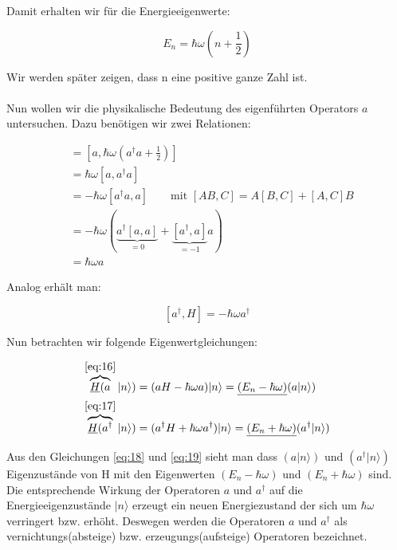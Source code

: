 Damit erhalten wir für die Energieeigenwerte:

\begin{equation}
  \label{eq:15}
  \boxed{E_n = \hbar\omega\left(n + \frac{1}{2}\right) }
\end{equation}

Wir werden später zeigen, dass n eine positive ganze Zahl ist.\\
\\
Nun wollen wir die physikalische Bedeutung des eigenführten Operators \(a\) untersuchen. Dazu benötigen wir zwei Relationen:

\begin{align}
  [a,H] &= [a,\hbar\omega(a^\dagger a +\frac{1}{2})]  \\
&= \hbar\omega[a,a^\dagger a ]  \\
&=-\hbar\omega[a^\dagger a,a] \qquad \text{mit }[AB,C]=A[B,C]+[A,C]B \\
&=-\hbar\omega(\underbrace{a^\dagger[a,a]}_{=0}+\underbrace{[a^\dagger,a]}_{=-1}a)\\
&=\hbar\omega a \label{eq:16}
\end{align}

Analog erhält man:

\begin{equation}
  \label{eq:17}
  [a^\dagger,H] = -\hbar\omega a^\dagger
\end{equation}

Nun betrachten wir folgende Eigenwertgleichungen:

\begin{align}
 \overbrace{\underline{H}(a}^{\eqref{eq:16}}|n\rangle ) &= (aH-\hbar\omega a)|n\rangle  = \underline{(E_n-\hbar\omega)}(a|n\rangle ) \label{eq:18}\\
  \overbrace{\underline{H}(a^\dagger}^{\eqref{eq:17}}|n\rangle ) &= (a^\dagger H+\hbar\omega a^\dagger)|n\rangle  = \underline{(E_n+\hbar\omega)}(a^\dagger|n\rangle )\label{eq:19}
\end{align}



Aus den Gleichungen \eqref{eq:18} und \eqref{eq:19} sieht man dass \((a|n\rangle) \) und \((a^\dagger|n\rangle)\) Eigenzustände von H mit den Eigenwerten \((E_n-\hbar\omega)\) und  \((E_n+ \hbar\omega)\) sind. Die entsprechende Wirkung der Operatoren \(a\) und \(a^\dagger\) auf die Energieeigenzustände \(|n\rangle \) erzeugt ein neuen Energiezustand der sich um \(\hbar\omega\) verringert bzw. erhöht. Deswegen werden die Operatoren \(a\) und \(a^\dagger\) als vernichtungs(absteige) bzw. erzeugungs(aufsteige) Operatoren bezeichnet. 

